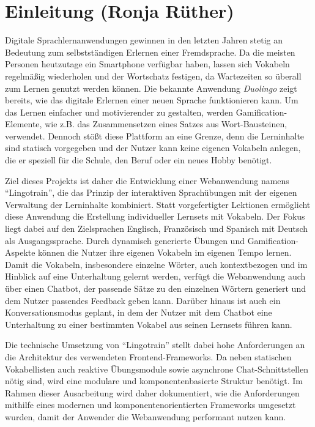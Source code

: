 \newpage
\section{Einleitung (Ronja Rüther)}
Digitale Sprachlernanwendungen gewinnen in den letzten Jahren stetig an Bedeutung
zum selbstständigen Erlernen einer Fremdsprache. Da die meisten Personen heutzutage ein
Smartphone verfügbar haben, lassen sich Vokabeln regelmäßig wiederholen und der Wortschatz
festigen, da Wartezeiten so überall zum Lernen genutzt werden können.
Die bekannte Anwendung \textit{Duolingo} zeigt bereits, wie das digitale Erlernen einer neuen Sprache 
funktionieren kann. Um das Lernen einfacher und motivierender zu gestalten, werden 
Gamification-Elemente, wie z.B. das Zusammensetzen eines Satzes aus Wort-Bausteinen, verwendet. \parencite{Duolingo}
Dennoch stößt diese Plattform an eine Grenze, denn die Lerninhalte sind statisch vorgegeben
und der Nutzer kann keine eigenen Vokabeln anlegen, die er speziell für die Schule, den Beruf oder ein
neues Hobby benötigt.

Ziel dieses Projekts ist daher die Entwicklung einer Webanwendung namens \enquote{Lingotrain},
die das Prinzip der interaktiven Sprachübungen mit der eigenen Verwaltung der Lerninhalte kombiniert.
Statt vorgefertigter Lektionen ermöglicht diese Anwendung die Erstellung individueller Lernsets mit Vokabeln.
Der Fokus liegt dabei auf den Zielsprachen Englisch, Französisch und Spanisch mit Deutsch als Ausgangssprache.
Durch dynamisch generierte Übungen und Gamification-Aspekte können die Nutzer ihre eigenen 
Vokabeln im eigenen Tempo lernen.
Damit die Vokabeln, insbesondere einzelne Wörter, auch kontextbezogen und im Hinblick auf eine 
Unterhaltung gelernt werden, verfügt die Webanwendung auch über einen Chatbot, der passende Sätze 
zu den einzelnen Wörtern generiert und dem Nutzer passendes Feedback geben kann. Darüber hinaus ist auch
ein Konversationsmodus geplant, in dem der Nutzer mit dem Chatbot eine Unterhaltung zu einer bestimmten
Vokabel aus seinen Lernsets führen kann.

Die technische Umsetzung von \enquote{Lingotrain} stellt dabei hohe Anforderungen an die Architektur
des verwendeten Frontend-Frameworks. Da neben statischen Vokabellisten auch reaktive Übungsmodule sowie
asynchrone Chat-Schnittstellen nötig sind, wird eine modulare und komponentenbasierte Struktur benötigt.
Im Rahmen dieser Ausarbeitung wird daher dokumentiert, wie die Anforderungen mithilfe eines modernen und 
komponentenorientierten Frameworks umgesetzt wurden, damit der Anwender die Webanwendung performant nutzen 
kann.

